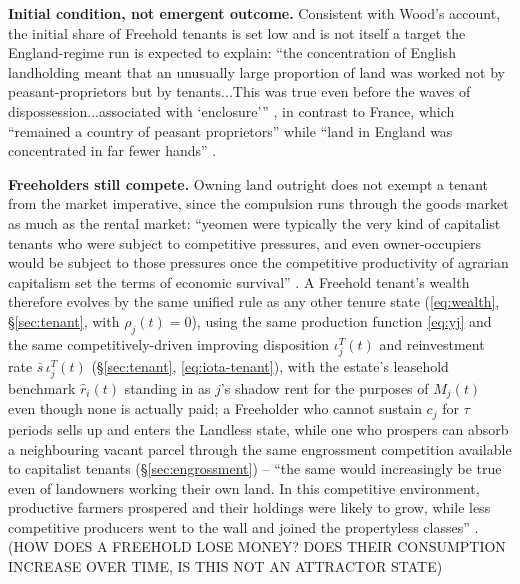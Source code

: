 \documentclass[11pt,english]{article}
\begin{document}
\textbf{Initial condition, not emergent outcome.} Consistent with Wood's account, the initial share of Freehold tenants is set low and is not itself a target the England-regime run is expected to explain: ``the concentration of English landholding meant that an unusually large proportion of land was worked not by peasant-proprietors but by tenants...This was true even before the waves of dispossession...associated with `enclosure''' \cite[p.99-100]{wood2002origin}, in contrast to France, which ``remained a country of peasant proprietors'' while ``land in England was concentrated in far fewer hands'' \cite[p.133]{wood2002origin}.

\textbf{Freeholders still compete.} Owning land outright does not exempt a tenant from the market imperative, since the compulsion runs through the goods market as much as the rental market: ``yeomen were typically the very kind of capitalist tenants who were subject to competitive pressures, and even owner-occupiers would be subject to those pressures once the competitive productivity of agrarian capitalism set the terms of economic survival'' \cite[p.54]{wood2002origin}. A Freehold tenant's wealth therefore evolves by the same unified rule as any other tenure state (\eqref{eq:wealth}, \S\ref{sec:tenant}, with $\rho_j(t)=0$), using the same production function \eqref{eq:yj} and the same competitively-driven improving disposition $\iota_j^{T}(t)$ and reinvestment rate $\bar s\,\iota_j^{T}(t)$ (\S\ref{sec:tenant}, \eqref{eq:iota-tenant}), with the estate's leasehold benchmark $\hat r_i(t)$ standing in as $j$'s shadow rent for the purposes of $M_j(t)$ even though none is actually paid; a Freeholder who cannot sustain $c_j$ for $\tau$ periods sells up and enters the Landless state, while one who prospers can absorb a neighbouring vacant parcel through the same engrossment competition available to capitalist tenants (\S\ref{sec:engrossment}) -- ``the same would increasingly be true even of landowners working their own land. In this competitive environment, productive farmers prospered and their holdings were likely to grow, while less competitive producers went to the wall and joined the propertyless classes'' \cite[p.103]{wood2002origin}. (HOW DOES A FREEHOLD LOSE MONEY? DOES THEIR CONSUMPTION INCREASE OVER TIME, IS THIS NOT AN ATTRACTOR STATE)
\end{document}
